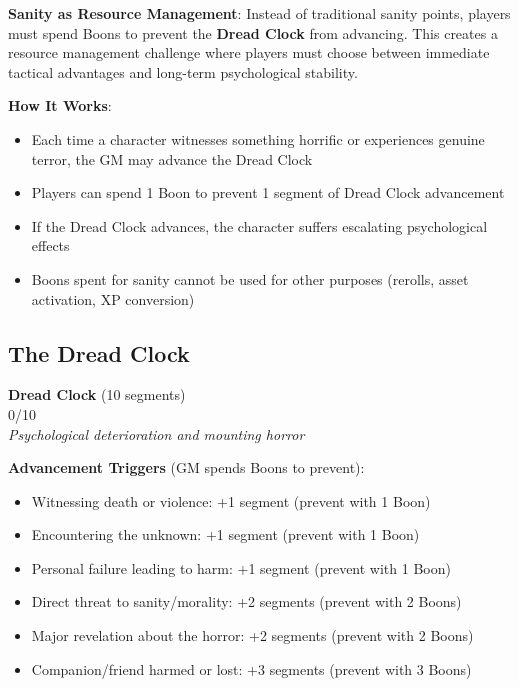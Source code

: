 \documentclass[11pt]{article}
\newcommand{\clocksegment}{\textbullet}
\begin{document}
\begin{mdframed}[backgroundcolor=sanitybg]
\textbf{Sanity as Resource Management}: Instead of traditional sanity points, players must spend Boons to prevent the \textbf{Dread Clock} from advancing. This creates a resource management challenge where players must choose between immediate tactical advantages and long-term psychological stability.

\textbf{How It Works}:
\begin{itemize}[leftmargin=*]
\item Each time a character witnesses something horrific or experiences genuine terror, the GM may advance the Dread Clock
\item Players can spend 1 Boon to prevent 1 segment of Dread Clock advancement
\item If the Dread Clock advances, the character suffers escalating psychological effects
\item Boons spent for sanity cannot be used for other purposes (rerolls, asset activation, XP conversion)
\end{itemize}
\end{mdframed}

\subsection*{The Dread Clock}

\begin{center}
\textbf{Dread Clock} (10 segments)\\
\fbox{\clocksegment\clocksegment\clocksegment\clocksegment\clocksegment\clocksegment\clocksegment\clocksegment\clocksegment\clocksegment} 0/10\\
\textit{Psychological deterioration and mounting horror}
\end{center}

\textbf{Advancement Triggers} (GM spends Boons to prevent):
\begin{itemize}[leftmargin=*]
\item Witnessing death or violence: +1 segment (prevent with 1 Boon)
\item Encountering the unknown: +1 segment (prevent with 1 Boon)
\item Personal failure leading to harm: +1 segment (prevent with 1 Boon)
\item Direct threat to sanity/morality: +2 segments (prevent with 2 Boons)
\item Major revelation about the horror: +2 segments (prevent with 2 Boons)
\item Companion/friend harmed or lost: +3 segments (prevent with 3 Boons)
\end{itemize}
\end{document}
